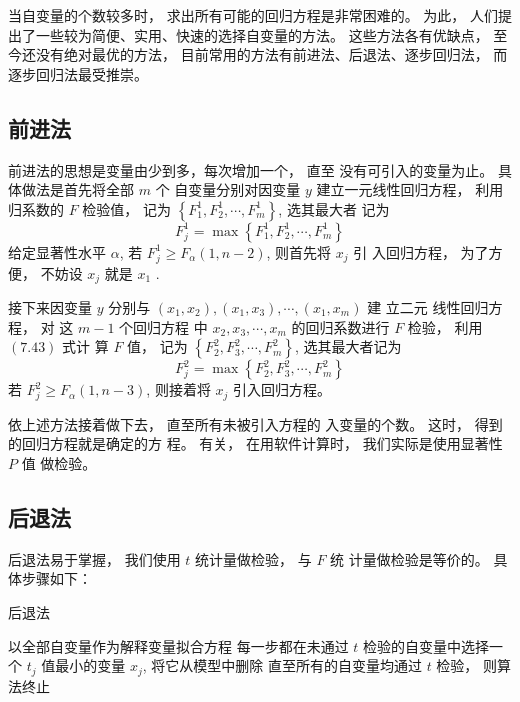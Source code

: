 当自变量的个数较多时， 求出所有可能的回归方程是非常困难的。 为此， 人们提出了一些较为简便、实用、快速的选择自变量的方法。 这些方法各有优缺点， 至今还没有绝对最优的方法， 目前常用的方法有前进法、后退法、逐步回归法， 而逐步回归法最受推崇。 

\subsection{前进法}

前进法的思想是变量由少到多，每次增加一个， 直至
没有可引入的变量为止。 具体做法是首先将全部 $  {m}  $ 个 自变量分别对因变量 $  {y}  $ 建立一元线性回归方程， 利用
归系数的 $  F  $ 检验值， 记为 $  \left\{F_{1}^{1}, F_{2}^{1}, \cdots, F_{m}^{1}\right\}  $, 选其最大者 记为
\begin{equation}
F_{j}^{1}=\max \left\{F_{1}^{1}, F_{2}^{1}, \cdots, F_{m}^{1}\right\}
\end{equation}
给定显著性水平 $  \alpha  $, 若 $  F_{j}^{1} \geq F_{\alpha}(1, n-2)  $, 则首先将 $  {x}_{j}  $ 引 入回归方程， 为了方便， 不妨设 $  {x}_{j}  $ 就是 $  {x}_{1}  $ . 

接下来因变量 $  y  $ 分别与 $  \left(x_{1}, x_{2}\right),\left(x_{1}, x_{3}\right), \cdots,\left(x_{1}, x_{m}\right)  $ 建
立二元 线性回归方程， 对 这 $  {m}-{1}  $ 个回归方程 中 $  x_{2}, x_{3}, \cdots, x_{m}  $ 的回归系数进行 $  F  $ 检验， 利用 $  (7.43)  $ 式计 算 $  {F}  $ 值， 记为 $  \left\{{F}_{2}^{2}, {F}_{3}^{2}, \cdots, {F}_{m}^{2}\right\}  $, 选其最大者记为
\begin{equation}
F_{j}^{2}=\max \left\{F_{2}^{2}, F_{3}^{2}, \cdots, F_{m}^{2}\right\}
\end{equation}
若 $  {F}_{j}^{2} \geq {F}_{\alpha} {( 1 , n - 3 )}  $, 则接着将 $  {x}_{{j}}  $ 引入回归方程。 

依上述方法接着做下去， 直至所有未被引入方程的
入变量的个数。 这时， 得到的回归方程就是确定的方
程。 
有关， 在用软件计算时， 我们实际是使用显著性 $  {P}  $ 值
做检验。 

\subsection{后退法}

后退法易于掌握， 我们使用 $  t  $ 统计量做检验， 与 $  {F}  $ 统
计量做检验是等价的。 具体步骤如下：

\begin{algorithm}
    \caption{后退法}
    以全部自变量作为解释变量拟合方程\;
    每一步都在未通过 $  {t}  $ 检验的自变量中选择一个
$  {t}_{j}  $ 值最小的变量 $  {x}_{j}  $, 将它从模型中删除\;
    直至所有的自变量均通过 $  {t}  $ 检验， 则算法终止\;
\end{algorithm}
